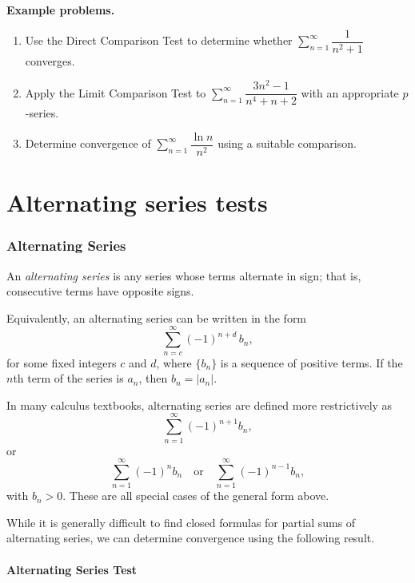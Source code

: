 \textbf{Example problems.}

\begin{enumerate}
    \item Use the Direct Comparison Test to determine whether $\sum_{n=1}^{\infty}\dfrac{1}{n^2+1}$ converges.
    \item Apply the Limit Comparison Test to $\sum_{n=1}^{\infty}\dfrac{3n^2-1}{n^4+n+2}$ with an appropriate $p$-series.
    \item Determine convergence of $\sum_{n=1}^{\infty}\dfrac{\ln n}{n^2}$ using a suitable comparison.
\end{enumerate}

\section{Alternating series tests}
\label{sec:alte-c075}


\subsubsection{Alternating Series}
\label{sss:alte-4145}

An \textit{alternating series} is any series whose terms alternate in sign; 
that is, consecutive terms have opposite signs.

Equivalently, an alternating series can be written in the form
\[
\sum_{n=c}^{\infty} (-1)^{n+d} \, b_n,
\]
for some fixed integers $c$ and $d$, where $\{b_n\}$ is a sequence of 
positive terms. If the $n$th term of the series is $a_n$, then 
$b_n = |a_n|$.

In many calculus textbooks, alternating series are defined more restrictively as
\[
\sum_{n=1}^{\infty} (-1)^{n+1} b_n,
\]
or
\[
\sum_{n=1}^{\infty} (-1)^n b_n
\quad \text{or} \quad
\sum_{n=1}^{\infty} (-1)^{n-1} b_n,
\]
with $b_n > 0$. These are all special cases of the general form above.

\medskip

While it is generally difficult to find closed formulas for partial sums of 
alternating series, we can determine convergence using the following result.

\paragraph{Alternating Series Test}

